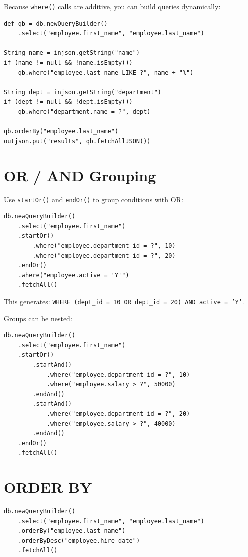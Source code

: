 Because \texttt{where()} calls are additive, you can build queries dynamically:

\begin{lstlisting}[style=groovy]
def qb = db.newQueryBuilder()
    .select("employee.first_name", "employee.last_name")

String name = injson.getString("name")
if (name != null && !name.isEmpty())
    qb.where("employee.last_name LIKE ?", name + "%")

String dept = injson.getString("department")
if (dept != null && !dept.isEmpty())
    qb.where("department.name = ?", dept)

qb.orderBy("employee.last_name")
outjson.put("results", qb.fetchAllJSON())
\end{lstlisting}

\section{OR / AND Grouping}
\label{sec:qb-or}

Use \texttt{startOr()} and \texttt{endOr()} to group conditions with OR:

\begin{lstlisting}[style=groovy]
db.newQueryBuilder()
    .select("employee.first_name")
    .startOr()
        .where("employee.department_id = ?", 10)
        .where("employee.department_id = ?", 20)
    .endOr()
    .where("employee.active = 'Y'")
    .fetchAll()
\end{lstlisting}

\noindent
This generates: \texttt{WHERE (dept\_id = 10 OR dept\_id = 20) AND active = 'Y'}.

Groups can be nested:

\begin{lstlisting}[style=groovy]
db.newQueryBuilder()
    .select("employee.first_name")
    .startOr()
        .startAnd()
            .where("employee.department_id = ?", 10)
            .where("employee.salary > ?", 50000)
        .endAnd()
        .startAnd()
            .where("employee.department_id = ?", 20)
            .where("employee.salary > ?", 40000)
        .endAnd()
    .endOr()
    .fetchAll()
\end{lstlisting}

\section{ORDER BY}
\label{sec:qb-orderby}

\begin{lstlisting}[style=groovy]
db.newQueryBuilder()
    .select("employee.first_name", "employee.last_name")
    .orderBy("employee.last_name")
    .orderByDesc("employee.hire_date")
    .fetchAll()
\end{lstlisting}

